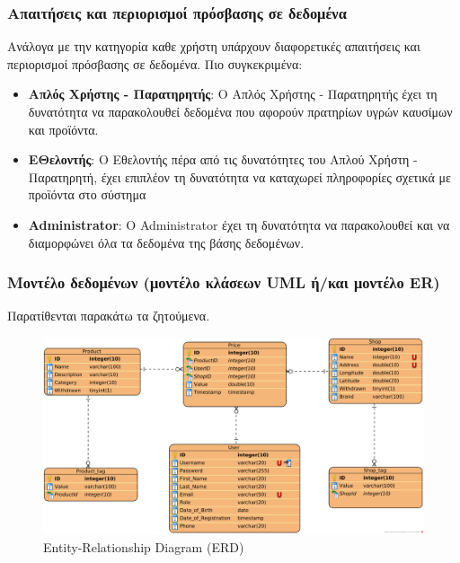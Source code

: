 \subsubsection{Απαιτήσεις και περιορισμοί πρόσβασης σε δεδομένα}
Ανάλογα με την κατηγορία καθε χρήστη υπάρχουν διαφορετικές απαιτήσεις και περιορισμοί πρόσβασης σε δεδομένα. Πιο συγκεκριμένα:
\begin{itemize}
    \item \textbf{Απλός Χρήστης - Παρατηρητής}: Ο Απλός Χρήστης - Παρατηρητής έχει τη δυνατότητα να παρακολουθεί δεδομένα που αφορούν πρατηρίων υγρών καυσίμων και προϊόντα.   
    \item \textbf{ΕΘελοντής}: Ο Εθελοντής πέρα από τις δυνατότητες του Απλού Χρήστη - Παρατηρητή, έχει επιπλέον τη δυνατότητα να καταχωρεί πληροφορίες σχετικά με προϊόντα στο σύστημα  
    \item \textbf{Administrator}: Ο Administrator έχει τη δυνατότητα να παρακολουθεί και να διαμορφώνει όλα τα δεδομένα της βάσης δεδομένων.
\end{itemize}



\subsubsection{Μοντέλο δεδομένων (μοντέλο κλάσεων UML ή/και μοντέλο ER)}
Παρατίθενται παρακάτω τα ζητούμενα.

\begin{figure}[H]
    \centering
    \includegraphics[width = \linewidth]{media/DB/ER.png}
    \caption{Entity-Relationship Diagram (ERD)}
\end{figure}


